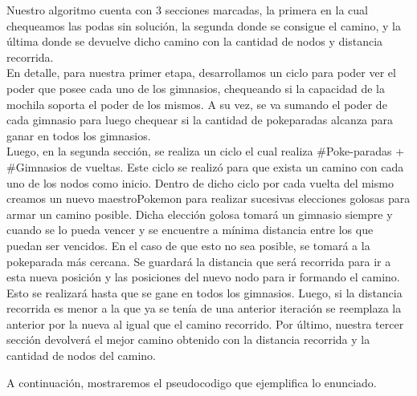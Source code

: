 Nuestro algoritmo cuenta con 3 secciones marcadas, la primera en la cual chequeamos las podas sin soluci\'on, la segunda donde se consigue el camino, y la \'ultima donde se devuelve dicho camino con la cantidad de nodos y distancia recorrida.\\
En detalle, para nuestra primer etapa, desarrollamos un ciclo para poder ver el poder que posee cada uno de los gimnasios, chequeando si la capacidad de la mochila soporta el poder de los mismos. A su vez, se va sumando el poder de cada gimnasio para luego chequear si la cantidad de pokeparadas alcanza para ganar en todos los gimnasios.\\
Luego, en la segunda secci\'on, se realiza un ciclo el cual realiza $\#$Poke-paradas + $\#$Gimnasios de vueltas. Este ciclo se realiz\'o para que exista un camino con cada uno de los nodos como inicio. Dentro de dicho ciclo por cada vuelta del mismo creamos un nuevo maestroPokemon para realizar sucesivas elecciones golosas para armar un camino posible. Dicha elecci\'on golosa tomar\'a un gimnasio siempre y cuando se lo pueda vencer y se encuentre a m\'inima distancia entre los que puedan ser vencidos. En el caso de que esto no sea posible, se tomar\'a a la pokeparada m\'as cercana. Se guardar\'a la distancia que ser\'a recorrida para ir a esta nueva posici\'on y las posiciones del nuevo nodo para ir formando el camino. Esto se realizar\'a hasta que se gane en todos los gimnasios. Luego, si la distancia recorrida es menor a la que ya se ten\'ia de una anterior iteraci\'on se reemplaza la anterior por la nueva al igual que el camino recorrido.
Por \'ultimo, nuestra tercer secci\'on devolver\'a el mejor camino obtenido con la distancia recorrida y la cantidad de nodos del camino.

A continuaci\'on, mostraremos el pseudocodigo que ejemplifica lo enunciado.

